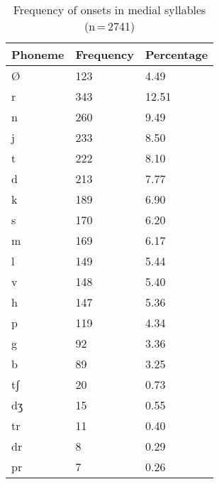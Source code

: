 \begin{table}[pth]\centering
\caption[Frequency of onsets in medial syllables]{Frequency of onsets in medial syllables (n\,=\,2741)}
\begin{tabu} to 0.5\textwidth{X X[c] X[c]}
\tableheaderfont\toprule
Phoneme
	& Frequency
	& Percentage
	\\
	
\toprule

Ø
	& 123
	& 4.49\pct
	\\

\midrule

r
	& 343
	& 12.51\pct
	\\

n
	& 260
	& 9.49\pct
	\\

j
	& 233
	& 8.50\pct
	\\

t
	& 222
	& 8.10\pct
	\\

d
	& 213
	& 7.77\pct
	\\

k
	& 189
	& 6.90\pct
	\\

s
	& 170
	& 6.20\pct
	\\

m
	& 169
	& 6.17\pct
	\\

l
	& 149
	& 5.44\pct
	\\

v
	& 148
	& 5.40\pct
	\\

h
	& 147
	& 5.36\pct
	\\

p
	& 119
	& 4.34\pct
	\\

g
	& 92
	& 3.36\pct
	\\

b
	& 89
	& 3.25\pct
	\\

tʃ
	& 20
	& 0.73\pct
	\\

dʒ
	& 15
	& 0.55\pct
	\\

tr
	& 11
	& 0.40\pct
	\\

dr
	& 8
	& 0.29\pct
	\\

pr
	& 7
	& 0.26\pct
	\\


\end{tabu}
\end{table}

